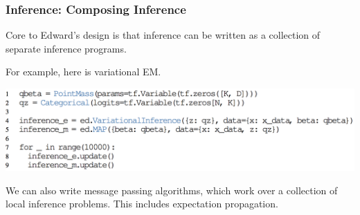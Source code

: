 \documentclass[10pt,
               xcolor={usenames,dvipsnames},
               hyperref={colorlinks,linktoc=all,citecolor=Plum,linkcolor=MidnightBlue,urlcolor=MidnightBlue},noamssymb]{beamer}
\begin{document}
\begin{frame}
\frametitle{Inference: Composing Inference}
Core to Edward's design is that inference can be written as a collection of separate inference programs.

For example, here is variational EM.

\begin{center}
\includegraphics[height=0.275\textheight]{img/composing.png}
\end{center}

We can also write message passing algorithms, which work over a collection of local inference problems. This includes expectation propagation.
\end{frame}





\end{document}
